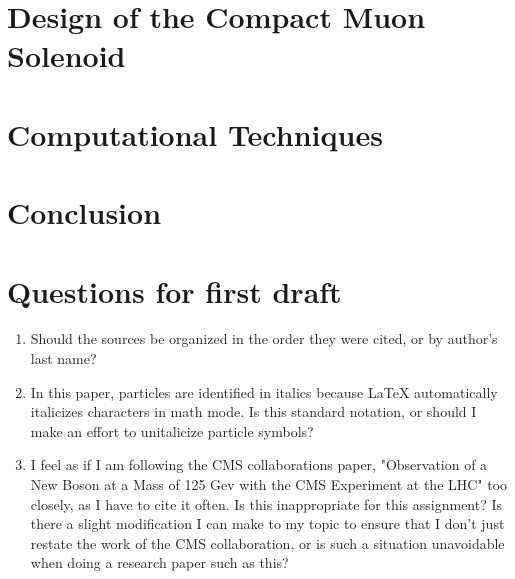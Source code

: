 \documentclass[12pt]{article}
\begin{document}
\section{Design of the Compact Muon Solenoid}
\section{Computational Techniques}
\label{comp_tech}
\section{Conclusion}






\section{Questions for first draft}
\begin{enumerate}
\item Should the sources be organized in the order they were cited, or by author's last name?
\item In this paper, particles are identified in italics because \LaTeX \; automatically italicizes characters in math mode. Is this standard notation, or should I make an effort to unitalicize particle symbols?
\item I feel as if I am following the CMS collaborations paper, "Observation of a New Boson at a Mass of 125 Gev with the CMS Experiment at the LHC" too closely, as I have to cite it often. Is this inappropriate for this assignment? Is there a slight modification I can make to my topic to ensure that I don't just restate the work of the CMS collaboration, or is such a situation unavoidable when doing a research paper such as this?
 
\end{enumerate}
\end{document}
